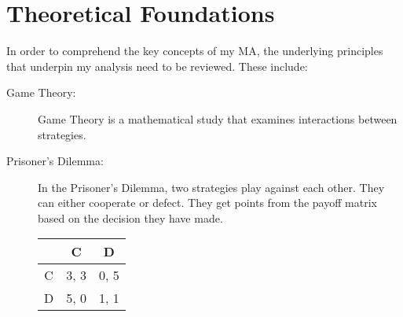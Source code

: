 \documentclass{article}
\begin{document}
\section{Theoretical Foundations}
	In order to comprehend the key concepts of my MA, the underlying principles that underpin my analysis need to be reviewed. These include:
	\begin{description}
		\item[Game Theory:] Game Theory is a mathematical study that examines interactions between strategies.
		\item[Prisoner's Dilemma:] In the Prisoner's Dilemma, two strategies play against each other. They can either cooperate or defect. They get points from the payoff matrix based on the decision they have made.


\begin{center}
\begin{tabular}{ c|c|c }
   & C & D \\ 
   \hline
C & 3, 3 & 0, 5\\  
   \hline
 D & 5, 0 & 1, 1
\end{tabular}
\end{center}


\end{description}
\end{document}
